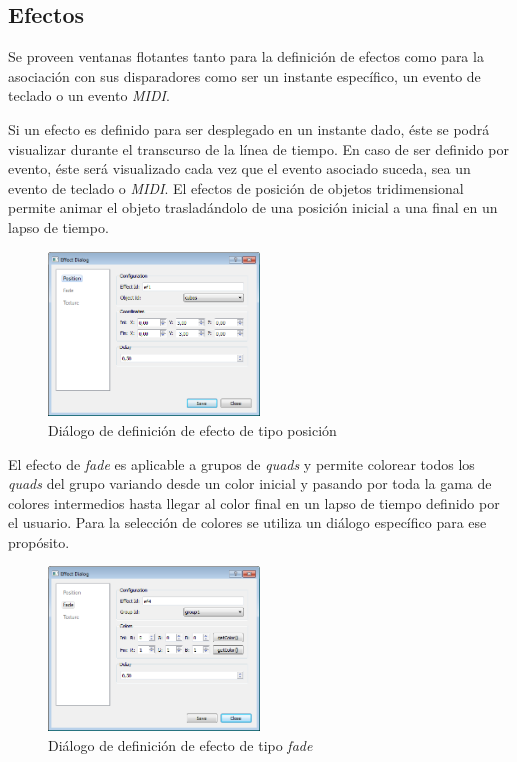 \subsection{Efectos}

Se proveen ventanas flotantes tanto para la definición de efectos como para la asociación con sus disparadores como ser un instante específico, un evento de teclado o un evento \emph{MIDI}.

Si un efecto es definido para ser desplegado en un instante dado, éste se podrá visualizar durante el transcurso de la línea de tiempo. En caso de ser definido por evento, éste será visualizado cada vez que el evento asociado suceda, sea un evento de teclado o \emph{MIDI}.
El efectos de posición de objetos tridimensional permite animar el objeto trasladándolo de una posición inicial a una final en un lapso de tiempo.

\begin{figure}[H]
  \centering
    \includegraphics[width=0.5\textwidth]{./Cap5_vmt/vmt_EfectDialog1.png}
  \caption{Diálogo de definición de efecto de tipo posición}
  \label{fig:VMT-EffectPossition}
\end{figure}

El efecto de \emph{fade} es aplicable a grupos de \emph{quads} y permite colorear todos los \emph{quads} del grupo variando desde un color inicial y pasando por toda la gama de colores intermedios hasta llegar al color final en un lapso de tiempo definido por el usuario. Para la selección de colores se utiliza un diálogo específico para ese propósito.

\begin{figure}[H]
  \centering
    \includegraphics[width=0.5\textwidth]{./Cap5_vmt/vmt_EfectDialog2.png}
  \caption{Diálogo de definición de efecto de tipo \emph{fade}}
  \label{fig:VMT-EffectFade}
\end{figure}

